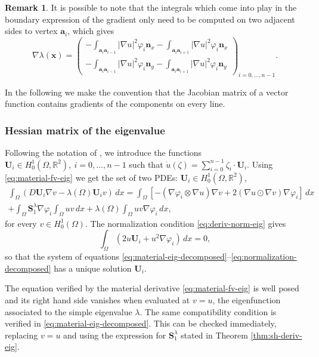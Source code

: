 \documentclass[11pt]{article}
\numberwithin{equation}{section}\newtheorem*{jepEnonce}{\jepEnonceTitle}\newenvironment{enonce*}[1]{\def\jepEnonceTitle{#1}\jepEnonce}{\endjepEnonce}\newtheorem*{conj*}{Conjecture}
\theoremstyle{plain}
\theoremstyle{definition}
\newtheorem{rem}[thm]{Remark}
\newcommand{\bo}[1]{{\boldsymbol#1}}
\let\Bbb\mathbb
\begin{document}
\begin{rem}
It is possible to note that the integrals which come into play in the boundary expression of the gradient only need to be computed on two adjacent sides to vertex $\bo a_i$, which gives
\[
\nabla \lambda (\bo x) = \begin{pmatrix}
-\int_{\bo a_{i}\bo a_{i-1}}|\nabla u|^2\varphi_i \bo n_x-\int_{\bo a_{i}\bo a_{i+1}}|\nabla u|^2\varphi_i \bo n_x\\
-\int_{\bo a_{i}\bo a_{i-1}}|\nabla u|^2\varphi_i \bo n_y-\int_{\bo a_{i}\bo a_{i+1}}|\nabla u|^2\varphi_i \bo n_y
\end{pmatrix}_{i=0,\dots,n-1}.
\]
\label{rem:grad-explicit}
\end{rem}

In the following we make the convention that the Jacobian matrix of a vector function contains gradients of the components on every line.

\subsubsection*{Hessian matrix of the eigenvalue} Following the notation of \cite{laurain2ndDeriv}, we introduce the functions $\bo U_i \in H_0^1(\Omega,\Bbb{R}^2),\ i=0,\dots,n-1$ such that $\dot u(\zeta) = \sum_{i=0}^{n-1} \zeta_i \cdot \bo U_i$. Using \eqref{eq:material-fv-eig} we get the set of two PDEs: $\bo U_i \in H_0^1(\Omega,\Bbb{R}^2)$,
\vspace*{-5pt}
\begin{multline}\label{eq:material-eig-decomposed}
\int_\Omega (D \bo U_i \nabla v-\lambda(\Omega) \bo U_iv) \, dx = \int_\Omega \left[-(\nabla \varphi_i\otimes \nabla u)\nabla v+2(\nabla u \odot \nabla v)\nabla \varphi_i\right] \, dx\\
+\int_\Omega \bo S_1^\lambda \nabla \varphi_i \int_\Omega uv\, dx + \lambda(\Omega) \int_\Omega uv \nabla \varphi_i\, dx,
\end{multline}
for every $v\in H_0^1(\Omega)$. The normalization condition \eqref{eq:deriv-norm-eig} gives
\begin{equation}
\int_\Omega (2u \bo U_i + u^2 \nabla \varphi_i)\, dx = 0,
\label{eq:normalization-decomposed}
\end{equation}
so that the system of equations \eqref{eq:material-eig-decomposed}--\eqref{eq:normalization-decomposed} has a unique solution $\bo U_i$.

The equation verified by the material derivative \eqref{eq:material-fv-eig} is well posed and its right hand side vanishes when evaluated at $v=u$, the eigenfunction associated to the simple eigenvalue $\lambda$. The same compatibility condition is verified in \eqref{eq:material-eig-decomposed}. This can be checked immediately, replacing $v=u$ and using the expression for $\bo S_1^\lambda$ stated in Theorem \ref{thm:sh-deriv-eig}.
\end{document}
